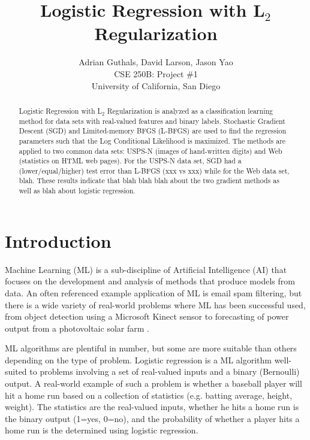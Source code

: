 \documentclass[10pt]{article}
\title{Logistic Regression with L$_2$ Regularization}
\author{Adrian Guthals, David Larson, Jason Yao \\
CSE 250B: Project \#1 \\
University of California, San Diego \\
}
\begin{document}
\maketitle


\begin{abstract}
Logistic Regression with L$_2$ Regularization is analyzed as a classification learning method for data sets with real-valued features and binary labels. Stochastic Gradient Descent (SGD) and Limited-memory BFGS (L-BFGS) are used to find the regression parameters such that the Log Conditional Likelihood is maximized. The methods are applied to two common data sets: USPS-N (images of hand-written digits) and Web (statistics on HTML web pages). For the USPS-N data set, SGD had a (lower/equal/higher) test error than L-BFGS (xxx vs xxx) while for the Web data set, blah. These results indicate that blah blah blah about the two gradient methods as well as blah about logistic regression.
\end{abstract}



\section{Introduction}
\label{sec:intro}

Machine Learning (ML) is a sub-discipline of Artificial Intelligence (AI) that focuses on the development and analysis of methods that produce models from data. An often referenced example application of ML is email spam filtering, but there is a wide variety of real-world problems where ML has been successful used, from object detection using a Microsoft Kinect sensor \cite{Kinect} to forecasting of power output from a photovoltaic solar farm \cite{solar}.

ML algorithms are plentiful in number, but some are more suitable than others depending on the type of problem. Logistic regression is a ML algorithm well-suited to problems involving a set of real-valued inputs and a binary (Bernoulli) output. A real-world example of such a problem is whether a baseball player will hit a home run based on a collection of statistics (e.g. batting average, height, weight). The statistics are the real-valued inputs, whether he hits a home run is the binary output (1=yes, 0=no), and the probability of whether a player hits a home run is the determined using logistic regression. 
\end{document}
